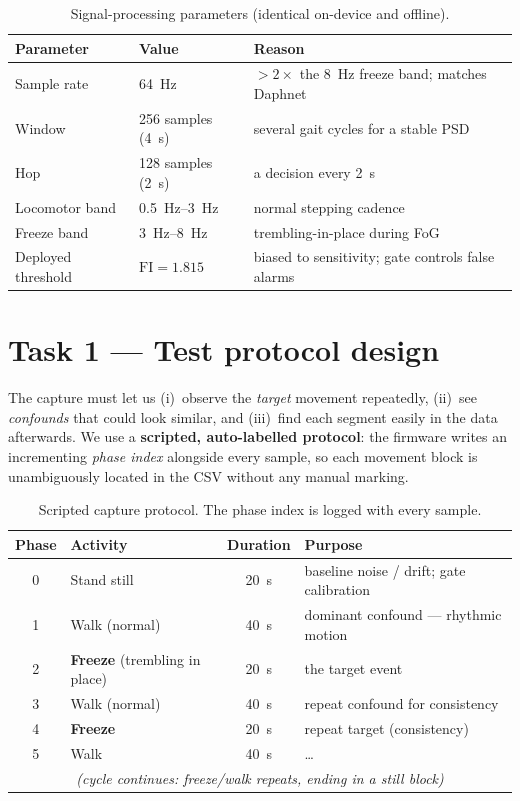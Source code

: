 \documentclass[11pt,a4paper]{article}
\begin{document}
\begin{table}[H]
\centering
\caption{Signal-processing parameters (identical on-device and offline).}
\begin{tabular}{@{}l l l@{}}
\toprule
\textbf{Parameter} & \textbf{Value} & \textbf{Reason}\\
\midrule
Sample rate & \SI{64}{\hertz} & $>2\times$ the \SI{8}{\hertz} freeze band; matches Daphnet\\
Window & 256 samples (\SI{4}{\second}) & several gait cycles for a stable PSD\\
Hop & 128 samples (\SI{2}{\second}) & a decision every \SI{2}{\second}\\
Locomotor band & \SIrange{0.5}{3}{\hertz} & normal stepping cadence\\
Freeze band & \SIrange{3}{8}{\hertz} & trembling-in-place during FoG\\
Deployed threshold & $\mathrm{FI}=1.815$ & biased to sensitivity; gate controls false alarms\\
\bottomrule
\end{tabular}
\end{table}

\section{Task 1 --- Test protocol design}

The capture must let us (i)~observe the \emph{target} movement repeatedly, (ii)~see
\emph{confounds} that could look similar, and (iii)~find each segment easily in the
data afterwards. We use a \textbf{scripted, auto-labelled protocol}: the firmware
writes an incrementing \emph{phase index} alongside every sample, so each movement
block is unambiguously located in the CSV without any manual marking.

\begin{table}[H]
\centering
\caption{Scripted capture protocol. The phase index is logged with every sample.}
\begin{tabular}{@{}c l c l@{}}
\toprule
\textbf{Phase} & \textbf{Activity} & \textbf{Duration} & \textbf{Purpose}\\
\midrule
0 & Stand still              & \SI{20}{\second} & baseline noise / drift; gate calibration\\
1 & Walk (normal)            & \SI{40}{\second} & dominant confound --- rhythmic motion\\
2 & \textbf{Freeze} (trembling in place) & \SI{20}{\second} & the target event\\
3 & Walk (normal)            & \SI{40}{\second} & repeat confound for consistency\\
4 & \textbf{Freeze}          & \SI{20}{\second} & repeat target (consistency)\\
5 & Walk                     & \SI{40}{\second} & \dots\\
\multicolumn{4}{c}{\itshape (cycle continues: freeze/walk repeats, ending in a still block)}\\
\bottomrule
\end{tabular}
\end{table}
\end{document}
